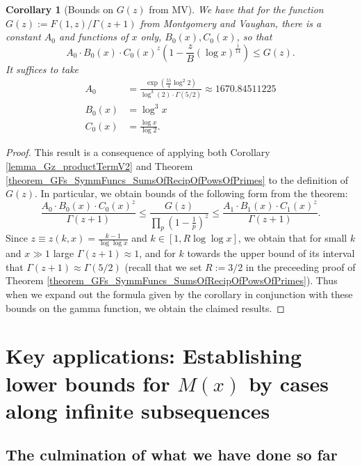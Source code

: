 \documentclass[11pt,reqno,a4letter]{article}
\numberwithin{figure}{section}
\numberwithin{table}{section}
\theoremstyle{plain}
\newtheorem{cor}[theorem]{Corollary}
\numberwithin{theorem}{section}
\theoremstyle{definition}
\begin{document}
\begin{cor}[Bounds on $G(z)$ from MV] 
\label{cor_BoundsOnGz_FromMVBook_initial_stmt_v1} 
We have that for the function $G(z) := F(1, z) / \Gamma(z+1)$ from Montgomery and Vaughan, there 
is a constant $A_0$ and functions of $x$ only, $B_0(x), C_0(x)$, so that 
\[
A_0 \cdot B_0(x) \cdot C_0(x)^{z} \left(1 - \frac{z}{B} (\log x)^{\frac{1}{14}}\right) \leq G(z). 
\]
It suffices to take 
\begin{align*} 
A_0 & = \frac{\exp\left(\frac{55}{4} \log^2 2\right)}{\log^3(2) \cdot \Gamma(5/2)} 
     \approx 1670.84511225 \\ 
B_0(x) & = \log^3 x \\ 
C_0(x) & = \frac{\log x}{\log 2}. 
\end{align*} 
\end{cor}
\begin{proof} 
This result is a consequence of applying both 
Corollary \ref{lemma_Gz_productTermV2} and 
Theorem \ref{theorem_GFs_SymmFuncs_SumsOfRecipOfPowsOfPrimes} to the definition of $G(z)$. 
In particular, we obtain bounds of the following form from the theorem: 
\[
\frac{A_0 \cdot B_0(x) \cdot C_0(x)^{z}}{\Gamma(z+1)} \leq 
     \frac{G(z)}{\prod_p \left(1-\frac{1}{p}\right)^{z}} \leq 
     \frac{A_1 \cdot B_1(x) \cdot C_1(x)^{z}}{\Gamma(z+1)}. 
\]
Since $z \equiv z(k, x) = \frac{k-1}{\log\log x}$ and $k \in [1, R\log\log x]$, we obtain that 
for small $k$ and $x \gg 1$ large $\Gamma(z+1) \approx 1$, and for $k$ towards the upper bound of 
its interval that $\Gamma(z+1) \approx \Gamma(5/2)$ (recall that we set $R := 3/2$ in the 
preceeding proof of Theorem \ref{theorem_GFs_SymmFuncs_SumsOfRecipOfPowsOfPrimes}). 
Thus when we expand out the formula given by the corollary in conjunction with these bounds on the 
gamma function, we obtain the claimed results. 
\end{proof} 

\newpage
\section{Key applications: Establishing lower bounds for $M(x)$ by cases along infinite subsequences} 
\label{Section_KeyApplications} 

\subsection{The culmination of what we have done so far} 
\end{document}
